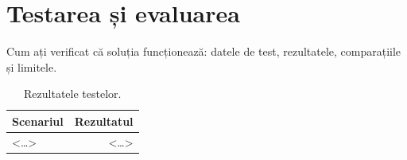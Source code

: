 \chapter{Testarea și evaluarea}
Cum ați verificat că soluția funcționează: datele de test, rezultatele, comparațiile și limitele.

\begin{table}[ht]\centering\sffamily\small
\begin{tabular}{@{}lr@{}}
\toprule
Scenariul & Rezultatul \\
\midrule
<…> & <…> \\
\bottomrule
\end{tabular}
\caption{Rezultatele testelor.}
\end{table}
